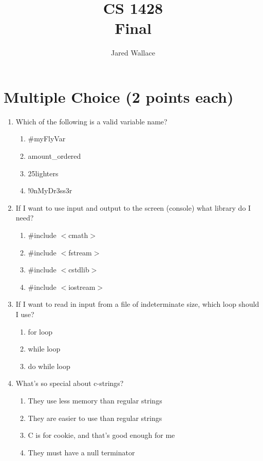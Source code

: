 \documentclass[letterpaper,12pt]{article}
\title{\Large CS 1428\\Final}
\author{Jared Wallace}
\date{}
\begin{document}
\maketitle

\section*{Multiple Choice (2 points each)}

\begin{enumerate}
   \item Which of the following is a valid variable name?
      \begin{enumerate}
         \item \#myFlyVar
         \item amount\_ordered
         \item 25lighters
         \item !0nMyDr3ss3r
      \end{enumerate}
   \item If I want to use input and output to the screen (console) what library do I need?
      \begin{enumerate}
         \item \#include $<$cmath$>$
         \item \#include $<$fstream$>$
         \item \#include $<$cstdlib$>$
         \item \#include $<$iostream$>$
      \end{enumerate}
   \item If I want to read in input from a file of indeterminate size, which loop should I use?
      \begin{enumerate}
         \item for loop
         \item while loop
         \item do while loop
      \end{enumerate}
   \item What's so special about c-strings?
      \begin{enumerate}
         \item They use less memory than regular strings
         \item They are easier to use than regular strings
         \item C is for cookie, and that's good enough for me
         \item They must have a null terminator
      \end{enumerate}


\end{enumerate}
\end{document}
